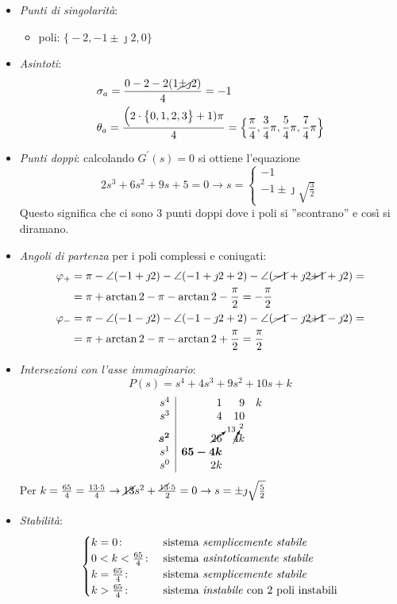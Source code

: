 \begin{itemize}
	\item \emph{Punti di singolarità}:
		\begin{itemize}
			\item poli: \(\bigl\{ -2, -1\pm\jmath2, 0 \bigr\}\)
		\end{itemize}
	\item \emph{Asintoti}:
		\begin{align*}
			& \sigma_a = \frac{0-2-2(1\cancel{\pm\jmath2})}{4} = -1 \\
			& \theta_a = \frac{\Bigl(2 \cdot \bigl\{ 0,1,2,3 \bigr\} +1)\pi}{4} = \Bigl\{ \frac{\pi}{4}, \frac{3}{4}\pi, \frac{5}{4}\pi, \frac{7}{4}\pi \Bigr\}
		\end{align*}
	\item \emph{Punti doppi}:
		calcolando \(G^\prime(s) = 0\) si ottiene l'equazione
		\[
			2s^3 +6s^2 +9s +5 = 0 \rightarrow s = \begin{cases} -1 \\ -1 \pm\jmath\sqrt{\frac{3}{2}} \end{cases}
		\]
		Questo significa che ci sono 3 punti doppi dove i poli si
		''scontrano'' e così si diramano.
	\item \emph{Angoli di partenza} per i poli complessi e coniugati:
		\begin{align*}
			\varphi_+ &= \pi - \angle(-1+\jmath2) -\angle(-1+\jmath2+2) -\angle(\cancel{-1}+\jmath2\cancel{+1}+\jmath2) = \\
				  &= \pi +\arctan{2} -\pi -\arctan{2} -\frac{\pi}{2} = -\frac{\pi}{2} \\
			\varphi_- &= \pi -\angle(-1-\jmath2) -\angle(-1-\jmath2+2) -\angle(\cancel{-1}-\jmath2\cancel{+1}-\jmath2) = \\
				  &= \pi +\arctan{2} -\pi -\arctan{2} +\frac{\pi}{2} = \frac{\pi}{2}
		\end{align*}
	\item \emph{Intersezioni con l'asse immaginario}:
		\[
			P(s) = s^4 +4s^3 +9s^2 +10s +k
		\]
		\[
			\begin{array}{r|rrr}
				s^4 & 1 &  9 & k \\
				s^3 & 4 & 10 \\
				\bm{s^2} & \cancelto{13}{26} & \cancelto{2}{4} k \\
				s^1 & \bm{65-4k} \\
				s^0 & 2k
			\end{array}
		\]
		Per \(k = \frac{65}{4} = \frac{13\cdot5}{4} \rightarrow \cancel{13}s^2 + \frac{\cancel{13}\cdot5}{2} = 0 \rightarrow s = \pm\jmath\sqrt{\frac{5}{2}}\)
	\item \emph{Stabilità}:
		\[\begin{cases}
			k=0\colon & \text{sistema \emph{semplicemente stabile}} \\
			0<k<\frac{65}{4}\colon & \text{sistema \emph{asintoticamente stabile}} \\
			k=\frac{65}{4}\colon & \text{sistema \emph{semplicemente stabile}} \\
			k>\frac{65}{4}\colon & \text{sistema \emph{instabile} con 2 poli instabili}
		\end{cases}\]
\end{itemize}


